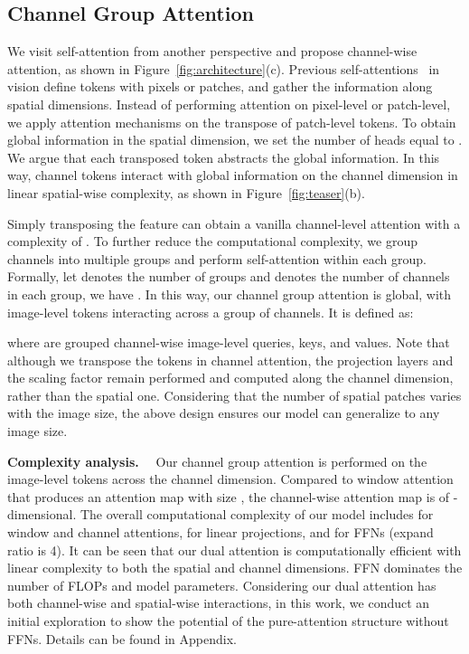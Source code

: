 \documentclass[runningheads]{llncs}
\begin{document}
\subsection{Channel Group Attention}
We visit self-attention from another perspective and propose channel-wise attention, as shown in Figure~\ref{fig:architecture}(c).
Previous self-attentions~\cite{vaswani2017attention,liu2021swin,wu2021cvt,vaswani2021scaling,zhang2020resnest,chen2020generative} in vision define tokens with pixels or patches, and gather the information along spatial dimensions.
Instead of performing attention on pixel-level or patch-level, we apply attention mechanisms on the transpose of patch-level tokens. 
To obtain global information in the spatial dimension, we set the number of heads equal to .
We argue that each transposed token abstracts the global information.
In this way, channel tokens interact with global information on the channel dimension in linear spatial-wise complexity, as shown in Figure~\ref{fig:teaser}(b).

Simply transposing the feature can obtain a vanilla channel-level attention with a complexity of .
To further reduce the computational complexity, we group channels into multiple groups and perform self-attention within each group.
Formally, let  denotes the number of groups and  denotes the number of channels in each group, we have .
In this way, our channel group attention is global, with image-level tokens interacting across a group of channels.
It is defined as:

where  are grouped channel-wise image-level queries, keys, and values.
Note that although we transpose the tokens in channel attention, the projection layers  and the scaling factor  remain performed and computed along the channel dimension, rather than the spatial one.
Considering that the number of spatial patches varies with the image size, the above design ensures our model can generalize to any image size.


\noindent \textbf{Complexity analysis.}~~
Our channel group attention is performed on the image-level tokens across the channel dimension. Compared to window attention that produces an attention map with size , the channel-wise attention map is of -dimensional.
The overall computational complexity of our model includes  for window and channel attentions,  for linear projections, and  for FFNs (expand ratio is 4). It can be seen that our dual attention is computationally efficient with linear complexity to both the spatial and channel dimensions.
FFN dominates the number of FLOPs and model parameters. Considering our dual attention has both channel-wise and spatial-wise interactions, in this work, we conduct an initial exploration to show the potential of the pure-attention structure without FFNs. Details can be found in Appendix.
\end{document}
